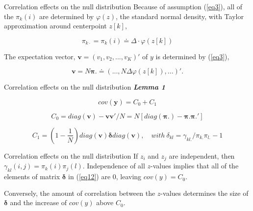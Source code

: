 \documentclass{beamer}
\begin{document}
\begin{frame}[t]{Correlation effects on the null distribution}\vspace{10pt}
Because of assumption (\ref{eq3}), all of the $\pi_k(i)$ are determined by $\varphi(z)$, the standard normal density, with Taylor approximation around centerpoint $z[k]$,

\begin{equation}\label{eq8}
\pi_{k\cdot}= \pi_k(i) \doteq  \Delta \cdot \varphi(z[k])
\end{equation}

The expectation vector, $\textbf{v} = (v_1, v_2, . . . , v_K)'$ of $y$ is determined by (\ref{eq3}),

\begin{equation}\label{eq9}
\textbf{v} = N \boldsymbol{\pi.}\doteq (...,N\Delta\varphi(z[k]),...)'.
\end{equation}

\end{frame}

\begin{frame}[t]{Correlation effects on the null distribution}\vspace{10pt}
\textbf{\textit{Lemma 1}}

\begin{equation}\label{eq10}
cov(\boldsymbol{y}) = C_0 +C_1
\end{equation}

\begin{equation}\label{eq11}
C_0 = diag(\boldsymbol{v}) - \boldsymbol{v}\boldsymbol{v'}/N = N[diag(\boldsymbol{\pi.}) - \boldsymbol{\pi.}\boldsymbol{\pi.'}]
\end{equation}

\begin{equation}\label{eq12}
C_1 = (1-\frac{1}{N})diag(\boldsymbol{v})\boldsymbol{\delta}diag(\boldsymbol{v}), \quad with \ \delta_{kl} = \gamma_{kl.}/\pi_{k.}\pi_{l.} -1
\end{equation}
\end{frame}

\begin{frame}[t]{Correlation effects on the null distribution}\vspace{10pt}
If $z_i$ and $z_j$ are independent, then$\gamma_{kl}(i,j)=\pi_{k}(i)\pi_{j}(l)$. Independence of all $z$-values implies that all of the elements of matrix $\boldsymbol{\delta}$ in (\ref{eq12}) are 0, leaving $cov(y) = C_0$.

Conversely, the amount of correlation between the $z$-values determines the size of $\boldsymbol{\delta}$ and the increase of $cov(y)$ above $C_0$.


\end{frame}
\end{document}
